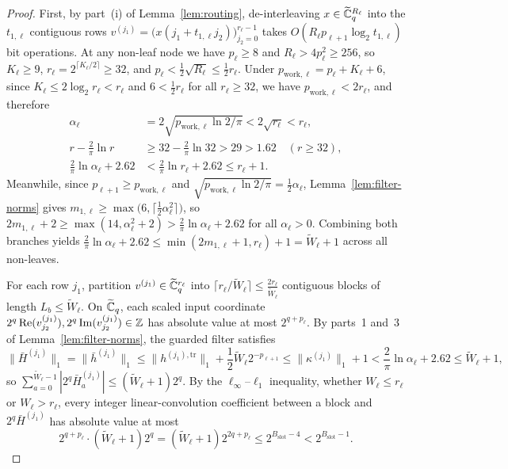 \begin{proof}
First, by part~(i) of Lemma~\ref{lem:routing}, de-interleaving $x \in \widetilde{\mathbb{C}}_q^{R_\ell}$ into the $t_{1,\ell}$ contiguous rows $v^{(j_1)} = \bigl(x(j_1 + t_{1,\ell} j_2)\bigr)_{j_2=0}^{r_\ell-1}$ takes $O(R_\ell p_{\ell+1} \log_2 t_{1,\ell})$ bit operations. At any non-leaf node we have $p_\ell \ge 8$ and $R_\ell > 4 p_\ell^2 \ge 256$, so $K_\ell \ge 9$, $r_\ell = 2^{\lceil K_\ell / 2 \rceil} \ge 32$, and $p_\ell < \frac{1}{2}\sqrt{R_\ell} \le \frac{1}{2} r_\ell$. Under $p_{\mathrm{work},\ell} = p_\ell + K_\ell + 6$, since $K_\ell \le 2\log_2 r_\ell < r_\ell$ and $6 < \frac{1}{2} r_\ell$ for all $r_\ell \ge 32$, we have $p_{\mathrm{work},\ell} < 2 r_\ell$, and therefore
\begin{align*}
  \alpha_\ell &= 2\sqrt{p_{\mathrm{work},\ell}\ln 2 / \pi} < 2\sqrt{r_\ell} < r_\ell, \\
  r - \frac{2}{\pi}\ln r &\ge 32 - \frac{2}{\pi}\ln 32 > 29 > 1.62 \quad (r \ge 32), \\
  \frac{2}{\pi}\ln\alpha_\ell + 2.62 &< \frac{2}{\pi}\ln r_\ell + 2.62 \le r_\ell + 1.
\end{align*}
Meanwhile, since $p_{\ell+1} \ge p_{\mathrm{work},\ell}$ and $\sqrt{p_{\mathrm{work},\ell}\ln 2 / \pi} = \frac{1}{2}\alpha_\ell$, Lemma~\ref{lem:filter-norms} gives $m_{1,\ell} \ge \max\bigl(6, \lceil \frac{1}{2}\alpha_\ell^2 \rceil\bigr)$, so $2m_{1,\ell} + 2 \ge \max(14, \alpha_\ell^2 + 2) > \frac{2}{\pi}\ln\alpha_\ell + 2.62$ for all $\alpha_\ell > 0$. Combining both branches yields $\frac{2}{\pi}\ln\alpha_\ell + 2.62 \le \min(2m_{1,\ell}+1, r_\ell) + 1 = \tilde{W}_\ell + 1$ across all non-leaves.

For each row $j_1$, partition $v^{(j_1)} \in \widetilde{\mathbb{C}}_q^{r_\ell}$ into $\lceil r_\ell / \tilde{W}_\ell \rceil \le \frac{2 r_\ell}{\tilde{W}_\ell}$ contiguous blocks of length $L_b \le \tilde{W}_\ell$. On $\widetilde{\mathbb{C}}_q$, each scaled input coordinate $2^q \operatorname{Re}(v^{(j_1)}_{j_2}), 2^q \operatorname{Im}(v^{(j_1)}_{j_2}) \in \mathbb{Z}$ has absolute value at most $2^{q + p_\ell}$. By parts~1 and~3 of Lemma~\ref{lem:filter-norms}, the guarded filter satisfies
\[
  \|\bar{H}^{(j_1)}\|_1 = \|\bar{h}^{(j_1)}\|_1 \le \|h^{(j_1),\mathrm{tr}}\|_1 + \frac{1}{2}\tilde{W}_\ell 2^{-p_{\ell+1}} \le \|\kappa^{(j_1)}\|_1 + 1 < \frac{2}{\pi}\ln\alpha_\ell + 2.62 \le \tilde{W}_\ell + 1,
\]
so $\sum_{a=0}^{\tilde{W}_\ell-1} |2^q \bar{H}^{(j_1)}_a| \le (\tilde{W}_\ell + 1) 2^q$. By the $\ell_\infty$--$\ell_1$ inequality, whether $W_\ell \le r_\ell$ or $W_\ell > r_\ell$, every integer linear-convolution coefficient between a block and $2^q \bar{H}^{(j_1)}$ has absolute value at most
\[
  2^{q+p_\ell} \cdot (\tilde{W}_\ell + 1) 2^q = (\tilde{W}_\ell + 1) 2^{2q + p_\ell} \le 2^{B_{\mathrm{slot}}-4} < 2^{B_{\mathrm{slot}}-1}.
\]


\end{proof}
